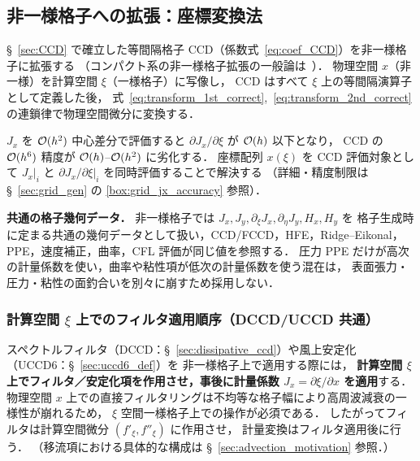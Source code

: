 %
%
\subsection{非一様格子への拡張：座標変換法}
\label{sec:ccd_metric}

§~\ref{sec:CCD} で確立した等間隔格子 CCD（係数式~\eqref{eq:coef_CCD}）を非一様格子に拡張する
（コンパクト系の非一様格子拡張の一般論は~\cite{Lele1992}）．
物理空間 $x$（非一様）を計算空間 $\xi$（一様格子）に写像し，
CCD はすべて $\xi$ 上の等間隔演算子として定義した後，
式~\eqref{eq:transform_1st_correct},~\eqref{eq:transform_2nd_correct} の連鎖律で物理空間微分に変換する．

\begin{tcolorbox}[warnbox, title={$\partial J_x/\partial\xi$ の精度：全体精度への影響}]
$J_x$ を $\mathcal{O}(h^2)$ 中心差分で評価すると $\partial J_x/\partial\xi$ が $\mathcal{O}(h)$ 以下となり，
CCD の $\mathcal{O}(h^6)$ 精度が $\mathcal{O}(h)$–$\mathcal{O}(h^2)$ に劣化する．
座標配列 $x(\xi)$ を CCD 評価対象として $J_x|_i$ と $\partial J_x/\partial\xi|_i$ を同時評価することで解決する
（詳細・精度制限は §~\ref{sec:grid_gen} の \ref{box:grid_jx_accuracy} 参照）．
\end{tcolorbox}

\noindent\textbf{共通の格子幾何データ．}
非一様格子では $J_x,J_y,\partial_\xi J_x,\partial_\eta J_y,H_x,H_y$ を
格子生成時に定まる共通の幾何データとして扱い，CCD/FCCD，HFE，Ridge--Eikonal，
PPE，速度補正，曲率，CFL 評価が同じ値を参照する．
圧力 PPE だけが高次の計量係数を使い，曲率や粘性項が低次の計量係数を使う混在は，
表面張力・圧力・粘性の面釣合いを別々に崩すため採用しない．

\subsubsection{計算空間 \texorpdfstring{$\xi$}{xi} 上でのフィルタ適用順序（DCCD/UCCD 共通）}
\label{sec:cls_on_nonuniform}%

スペクトルフィルタ（DCCD：§~\ref{sec:dissipative_ccd}）や風上安定化（UCCD6：§~\ref{sec:uccd6_def}）を
非一様格子上で適用する際には，
\textbf{計算空間 $\xi$ 上でフィルタ／安定化項を作用させ，事後に計量係数 $J_x = \partial\xi/\partial x$ を適用}する．
物理空間 $x$ 上での直接フィルタリングは不均等な格子幅により高周波減衰の一様性が崩れるため，
$\xi$ 空間一様格子上での操作が必須である．
したがってフィルタは計算空間微分 $(f'_\xi, f''_\xi)$ に作用させ，
計量変換はフィルタ適用後に行う．
（移流項における具体的な構成は §~\ref{sec:advection_motivation} 参照．）

